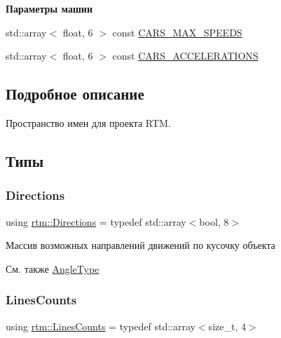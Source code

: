\begin{Indent}\textbf{ Параметры машин}\par
\begin{DoxyCompactItemize}
\item 
std\+::array$<$ float, 6 $>$ const \hyperlink{namespacertm_ab4d4feaa707f2d1eba41feae3b46451f}{C\+A\+R\+S\+\_\+\+M\+A\+X\+\_\+\+S\+P\+E\+E\+DS}
\item 
std\+::array$<$ float, 6 $>$ const \hyperlink{namespacertm_acac83b872b644793530e7f6f4660c85e}{C\+A\+R\+S\+\_\+\+A\+C\+C\+E\+L\+E\+R\+A\+T\+I\+O\+NS}
\end{DoxyCompactItemize}
\end{Indent}


\subsection{Подробное описание}
Пространство имен для проекта R\+TM. 

\subsection{Типы}
\mbox{\label{namespacertm_a4776fbfe59834ff1a16838ad6735b69a}} 
\subsubsection{\texorpdfstring{Directions}{Directions}}
{\footnotesize\ttfamily using \hyperlink{namespacertm_a4776fbfe59834ff1a16838ad6735b69a}{rtm\+::\+Directions} = typedef std\+::array$<$bool, 8$>$}

Массив возможных направлений движений по кусочку объекта \begin{DoxySeeAlso}{См. также}
\hyperlink{namespacertm_a69dc82b16a0148c10962caa83d930f89}{Angle\+Type} 
\end{DoxySeeAlso}
\mbox{\label{namespacertm_a14457f3088a92b86a96686b72d3e4eea}} 
\subsubsection{\texorpdfstring{Lines\+Counts}{LinesCounts}}
{\footnotesize\ttfamily using \hyperlink{namespacertm_a14457f3088a92b86a96686b72d3e4eea}{rtm\+::\+Lines\+Counts} = typedef std\+::array$<$size\+\_\+t, 4$>$}

